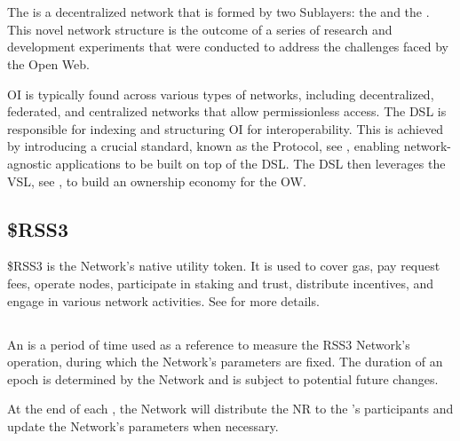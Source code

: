\section{}

The  is a decentralized network that is formed by two Sublayers: the  and the .
This novel network structure is the outcome of a series of research and development experiments that were conducted to address the challenges faced by the Open Web.

\gls{OI} is typically found across various types of networks, including decentralized, federated, and centralized networks that allow permissionless access.
The \gls{DSL} is responsible for indexing and structuring \gls{OI} for interoperability.
This is achieved by introducing a crucial standard, known as the \gls{Protocol}, see , enabling network-agnostic applications to be built on top of the \gls{DSL}.
The \gls{DSL} then leverages the \gls{VSL}, see , to build an ownership economy for the \gls{OW}.

\subsection{\$RSS3}
\$RSS3 is the Network's native utility token. It is used to cover gas, pay request fees, operate nodes, participate in staking and trust, distribute incentives, and engage in various network activities.
See  for more details.

\subsection{}

An  is a period of time used as a reference to measure the RSS3 Network’s operation, during which the Network's parameters are fixed.
The duration of an epoch is determined by the Network and is subject to potential future changes.

At the end of each \epoch, the Network will distribute the \gls{NR} to the 's participants and update the Network's parameters when necessary.